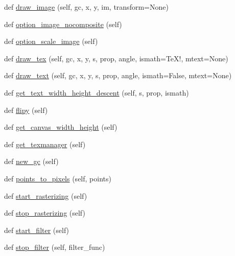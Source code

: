 \begin{DoxyCompactItemize}
\item 
def \hyperlink{classmatplotlib_1_1backend__bases_1_1RendererBase_aef918271afa5633f931c0c52a7248542}{draw\+\_\+image} (self, gc, x, y, im, transform=None)
\item 
def \hyperlink{classmatplotlib_1_1backend__bases_1_1RendererBase_abfc01341167f612af663bd02aec07e5a}{option\+\_\+image\+\_\+nocomposite} (self)
\item 
def \hyperlink{classmatplotlib_1_1backend__bases_1_1RendererBase_a291ded5b0a681125bc27a87e746b9c21}{option\+\_\+scale\+\_\+image} (self)
\item 
def \hyperlink{classmatplotlib_1_1backend__bases_1_1RendererBase_a49c49f45ec1805700539b3d996d8386b}{draw\+\_\+tex} (self, gc, x, y, s, prop, angle, ismath=\textquotesingle{}Te\+X!\textquotesingle{}, mtext=None)
\item 
def \hyperlink{classmatplotlib_1_1backend__bases_1_1RendererBase_a0ed949a227903d6659e8eb332d29da2d}{draw\+\_\+text} (self, gc, x, y, s, prop, angle, ismath=False, mtext=None)
\item 
def \hyperlink{classmatplotlib_1_1backend__bases_1_1RendererBase_aee1b6e8eb0b0ff79a2f5bebe17e46b57}{get\+\_\+text\+\_\+width\+\_\+height\+\_\+descent} (self, s, prop, ismath)
\item 
def \hyperlink{classmatplotlib_1_1backend__bases_1_1RendererBase_a7dfe1095e947521fe8a6e2f130980699}{flipy} (self)
\item 
def \hyperlink{classmatplotlib_1_1backend__bases_1_1RendererBase_abe71fe32fbfb58c60198eb372ef5dea1}{get\+\_\+canvas\+\_\+width\+\_\+height} (self)
\item 
def \hyperlink{classmatplotlib_1_1backend__bases_1_1RendererBase_a5baac3ea895c8af5d157d105f049fce4}{get\+\_\+texmanager} (self)
\item 
def \hyperlink{classmatplotlib_1_1backend__bases_1_1RendererBase_aa36cdf81b9dbd92f2b98467a2aadaed9}{new\+\_\+gc} (self)
\item 
def \hyperlink{classmatplotlib_1_1backend__bases_1_1RendererBase_a64e53fbd4a31d6267706d73d83f0ddb6}{points\+\_\+to\+\_\+pixels} (self, points)
\item 
def \hyperlink{classmatplotlib_1_1backend__bases_1_1RendererBase_a99dbecc9c5a64c75c7a191a06a728781}{start\+\_\+rasterizing} (self)
\item 
def \hyperlink{classmatplotlib_1_1backend__bases_1_1RendererBase_a596cc2026f43c4e9996e5f5d9b813e0a}{stop\+\_\+rasterizing} (self)
\item 
def \hyperlink{classmatplotlib_1_1backend__bases_1_1RendererBase_a3494a42b9937b3ce2366bde08692e8a5}{start\+\_\+filter} (self)
\item 
def \hyperlink{classmatplotlib_1_1backend__bases_1_1RendererBase_ac260e1a9f08f1decdab28fcd819bd51e}{stop\+\_\+filter} (self, filter\+\_\+func)
\end{DoxyCompactItemize}


